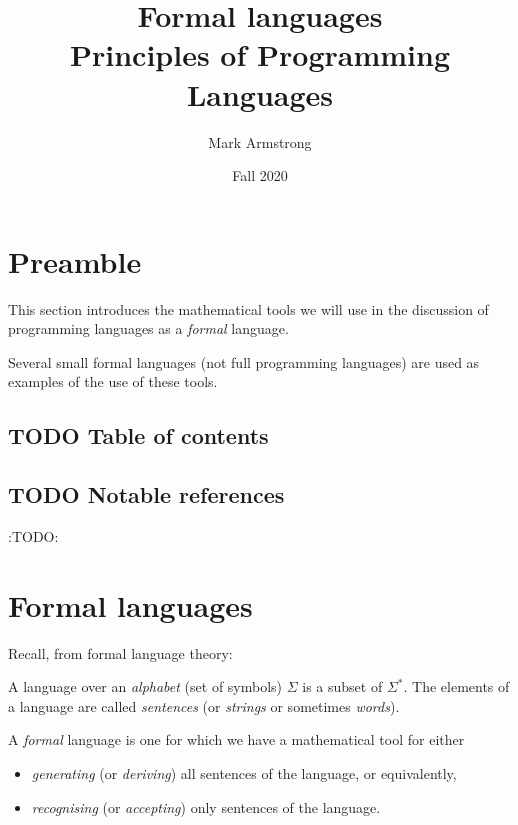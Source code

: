 \documentclass[11pt]{article}
\author{Mark Armstrong}
\date{Fall 2020}
\title{Formal languages\\\medskip
\large Principles of Programming Languages}
\theoremstyle{definition}
\begin{document}
\maketitle

\section{Preamble}
\label{sec:org1dccc8a}

This section introduces the mathematical tools
we will use in the discussion of programming languages
as a \emph{formal} language.

Several small formal languages (not full programming languages)
are used as examples of the use of these tools.

\subsection{{\bfseries\sffamily TODO} Table of contents}
\label{sec:org9634e0d}

\begin{scriptsize}

\end{scriptsize}

\subsection{{\bfseries\sffamily TODO} Notable references}
\label{sec:orgb5bf01a}

:TODO:

\section{Formal languages}
\label{sec:org133e4c9}

Recall, from formal language theory:

A language over an \emph{alphabet} (set of symbols) \(Σ\)
is a subset of \(Σ^{*}\).
The elements of a language are called \emph{sentences}
(or \emph{strings} or sometimes \emph{words}).

A \emph{formal} language is one for which we have a mathematical tool
for either
\begin{itemize}
\item \emph{generating} (or \emph{deriving}) all sentences of the language,
or equivalently,
\item \emph{recognising} (or \emph{accepting}) only sentences of the language.
\end{itemize}
\end{document}
